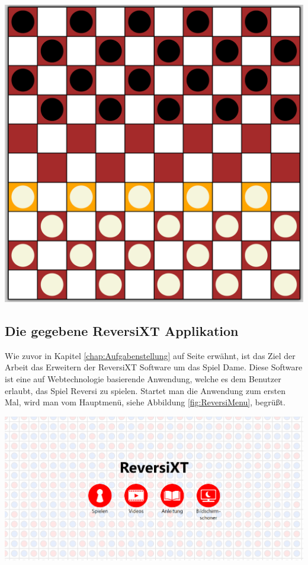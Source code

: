 \documentclass[12pt,a4paper,bibliography=totocnumbered,listof=totocnumbered]{article}
\begin{document}
\vspace{1em}
\begin{minipage}{\linewidth}
	\centering
	\includegraphics[width=0.5\linewidth]{pics/checkersboard.png}
	\label{fig:checkersboard}
\end{minipage}

\subsection{Die gegebene \ac{ReversiXT} Applikation}
\label{chap:gegebeneApp}
Wie zuvor in Kapitel \ref{chap:Aufgabenstellung} auf Seite \pageref{chap:Aufgabenstellung} erwähnt, ist das Ziel der Arbeit das Erweitern
der \ac{ReversiXT} Software um das Spiel Dame. Diese Software ist eine auf Webtechnologie basierende Anwendung, welche es dem Benutzer erlaubt,
das Spiel Reversi zu spielen. Startet man die Anwendung zum ersten Mal, wird man vom Hauptmenü, siehe Abbildung \ref{fig:ReversiMenu}, begrüßt.


\vspace{1em}
\begin{minipage}{\linewidth}
	\centering
	\includegraphics[width=0.7\linewidth]{pics/ReversiMenues.png}
	\label{fig:ReversiMenu}
\end{minipage}
\\
\end{document}
